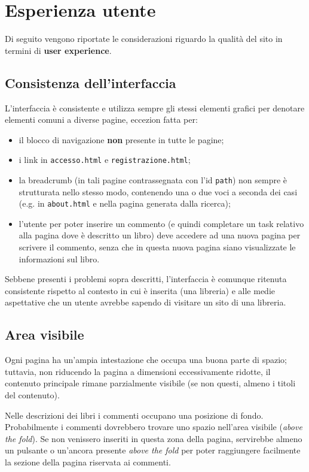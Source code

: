 \section{Esperienza utente}\label{sec:user-exp}
Di seguito vengono riportate le considerazioni riguardo la qualità del sito in
termini di \textbf{user experience}.

\subsection{Consistenza dell'interfaccia}\label{sec:user-ui_consistency}
L'interfaccia è consistente e utilizza sempre gli stessi elementi grafici per
denotare elementi comuni a diverse pagine, eccezion fatta per:
\begin{itemize}
\item il blocco di navigazione \textbf{non} presente in tutte le pagine;
\item i link in \texttt{accesso.html} e \texttt{registrazione.html};
\item la breadcrumb (in tali pagine contrassegnata con l'id \texttt{path}) non
sempre è strutturata nello stesso modo, contenendo una o due voci a seconda
dei casi (e.g. in \texttt{about.html} e nella pagina generata dalla ricerca);
\item l'utente per poter inserire un commento (e quindi completare un task
relativo alla pagina dove è descritto un libro) deve accedere ad una nuova
pagina per scrivere il commento, senza che in questa nuova pagina siano
visualizzate le informazioni sul libro.
\end{itemize}

Sebbene presenti i problemi sopra descritti, l'interfaccia è comunque ritenuta
consistente rispetto al contesto in cui è inserita (una libreria) e alle
medie aspettative che un utente avrebbe sapendo di visitare un sito di una
libreria.

\subsection{Area visibile}
Ogni pagina ha un'ampia intestazione che occupa una buona parte di spazio;
tuttavia, non riducendo la pagina a dimensioni eccessivamente ridotte, il
contenuto principale rimane parzialmente visibile (se non questi, almeno i
titoli del contenuto).

Nelle descrizioni dei libri i commenti occupano una posizione di fondo.
Probabilmente i commenti dovrebbero trovare uno spazio nell'area visibile
(\textit{above the fold}). Se non venissero inseriti in questa zona della
pagina, servirebbe almeno un pulsante o un'ancora presente \textit{above the
fold} per poter raggiungere facilmente la sezione della pagina riservata ai
commenti.

